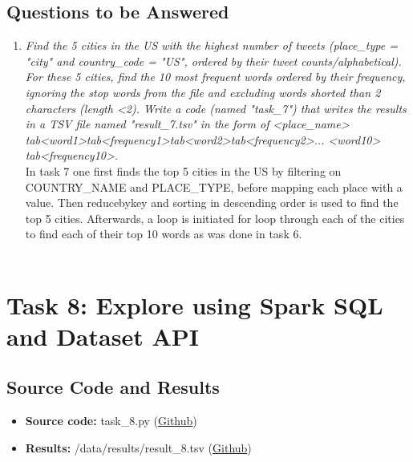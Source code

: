 \documentclass{article}
\begin{document}
\subsection*{Questions to be Answered}
\begin{enumerate}[label=\alph*)]
    \item \textit{Find the 5 cities in the US with the highest number of tweets (place\_type = "city" and country\_code = "US", ordered by their tweet counts/alphabetical). For these 5 cities, find the 10 most frequent words ordered by their frequency, ignoring the stop words from the file and excluding words shorted than 2 characters (length \textless 2). Write a code (named "task\_7") that writes the results in a TSV file named "result\_7.tsv" in the form of \textless place\_name\textgreater \\
    tab\textless word1\textgreater tab\textless frequency1\textgreater tab\textless word2\textgreater tab\textless frequency2\textgreater ... \textless word10\textgreater \\
    tab\textless frequency10\textgreater .}\\
    
    In task 7 one first finds the top 5 cities in the US by filtering on COUNTRY\_NAME and PLACE\_TYPE, before mapping each place with a value. Then reducebykey and sorting in descending order is used to find the top 5 cities. Afterwards, a loop is initiated for loop through each of the cities to find each of their top 10 words as was done in task 6.\\ \\
\end{enumerate}


\section*{Task 8: Explore using Spark SQL and Dataset API}
\subsection*{Source Code and Results}
    \begin{itemize}
        \item \textbf{Source code:} task\_8.py (\href{https://github.com/FredrikBakken/TDT4305_Big-Data-Project/blob/master/PhaseOne/task_8.py}{Github})
        \item \textbf{Results:} /data/results/result\_8.tsv (\href{https://github.com/FredrikBakken/TDT4305_Big-Data-Project/blob/master/PhaseOne/data/results/result_8.jpg}{Github})
    \end{itemize}
\end{document}
